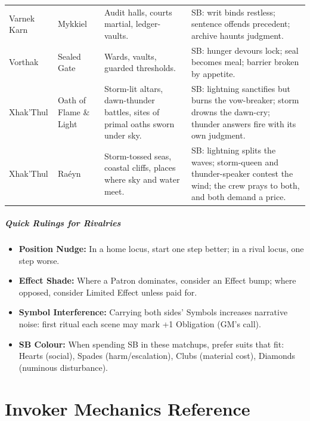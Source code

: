\begin{longtable}{@{}p{3.3cm}p{3.3cm}p{4.6cm}p{7.2cm}@{}}
  Varnek Karn & Mykkiel &
  Audit halls, courts martial, ledger-vaults. &
  SB: writ binds restless; sentence offends precedent; archive haunts judgment. \\

  Vorthak & Sealed Gate &
  Wards, vaults, guarded thresholds. &
  SB: hunger devours lock; seal becomes meal; barrier broken by appetite. \\

  Xhak'Thul & Oath of Flame \& Light &
  Storm-lit altars, dawn-thunder battles, sites of primal oaths sworn under sky. &
  SB: lightning sanctifies but burns the vow-breaker; storm drowns the dawn-cry; thunder answers fire with its own judgment. \\

  Xhak'Thul & Raéyn &
  Storm-tossed seas, coastal cliffs, places where sky and water meet. &
  SB: lightning splits the waves; storm-queen and thunder-speaker contest the wind; the crew prays to both, and both demand a price. \\  
\end{longtable}

\paragraph{Quick Rulings for Rivalries}
\label{subsec:rivalry-quick}

\begin{itemize}
  \item \textbf{Position Nudge:} In a home locus, start one step better; in a rival locus, one step worse.
  \item \textbf{Effect Shade:} Where a Patron dominates, consider an Effect bump; where opposed, consider Limited Effect unless paid for.
  \item \textbf{Symbol Interference:} Carrying both sides' Symbols increases narrative noise: first ritual each scene may mark +1 Obligation (GM's call).
  \item \textbf{SB Colour:} When spending SB in these matchups, prefer suits that fit: Hearts (social), Spades (harm/escalation), Clubs (material cost), Diamonds (numinous disturbance).
\end{itemize}


\clearpage
\appendix
\chapter{Invoker Mechanics Reference}
\label{app:invoker-mechanics}

